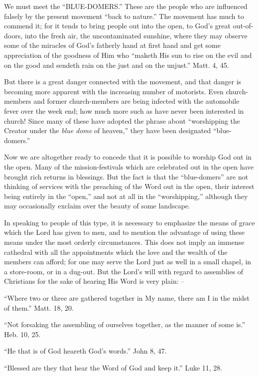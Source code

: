 \documentclass[
]{book}
\begin{document}
We must meet the ``BLUE-DOMERS.'' These are the people who are influenced falsely by the present movement ``back to nature.'' The movement has much to commend it; for it tends to bring people out into the open, to God's great out-of-doors, into the fresh air, the uncontaminated sunshine, where they may observe some of the miracles of God's fatherly hand at first hand and get some appreciation of the goodness of Him who ``maketh His sun to rise on the evil and on the good and sendeth rain on the just and on the unjust.'' Matt. 4, 45.

But there is a great danger connected with the movement, and that danger is becoming more apparent with the increasing number of motorists. Even church-members and former church-members are being infected with the automobile fever over the week end; how much more such as have never been interested in church! Since many of these have adopted the phrase about ``worshipping the Creator under the \emph{blue dome} of heaven,'' they have been designated ``blue-domers.''

Now we are altogether ready to concede that it is possible to worship God out in the open. Many of the mission-festivals which are celebrated out in the open have brought rich returns in blessings. But the fact is that the ``blue-domers'' are not thinking of services with the preaching of the Word out in the open, their interest being entirely in the ``open,'' and not at all in the ``worshipping,'' although they may occasionally exclaim over the beauty of some landscape.

In speaking to people of this type, it is necessary to emphasize the means of grace which the Lord has given to men, and to mention the advantage of using these means under the most orderly circumstances. This does not imply an immense cathedral with all the appointments which the love and the wealth of the members can afford; for one may serve the Lord just as well in a small chapel, in a store-room, or in a dug-out. But the Lord's will with regard to assemblies of Christians for the sake of hearing His Word is very plain: --

``Where two or three are gathered together in My name, there am I in the midst of them.'' Matt. 18, 20.

``Not forsaking the assembling of ourselves together, as the manner of some is.'' Heb. 10, 25.

``He that is of God heareth God's words.'' John 8, 47.

``Blessed are they that hear the Word of God and keep it.'' Luke 11, 28.
\end{document}

